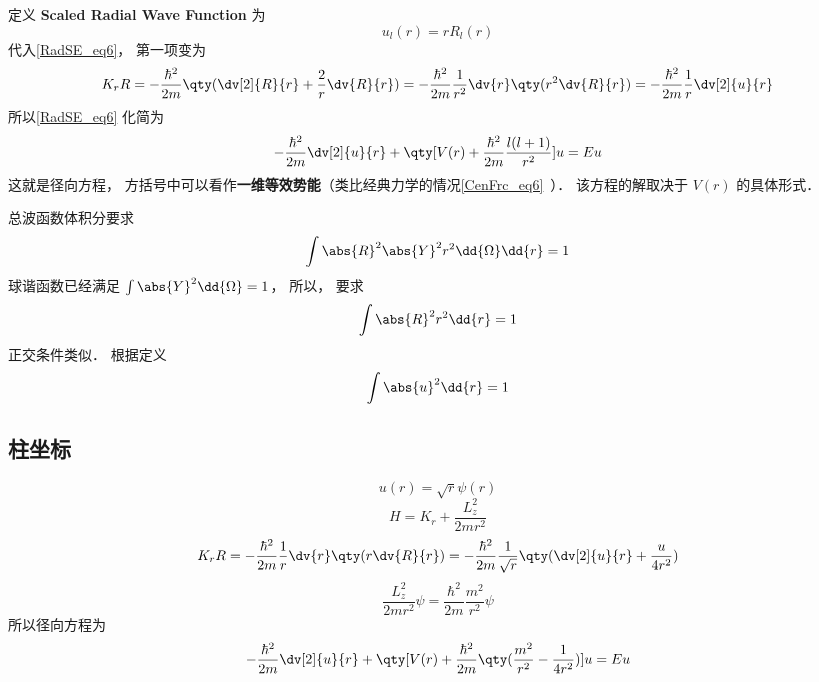 定义 \textbf{Scaled Radial Wave Function} 为
\begin{equation}
u_l(r) = r R_l(r)
\end{equation}
代入\autoref{RadSE_eq6}， 第一项变为
\begin{equation}
K_r R =  - \frac{\hbar^2}{2m} \qty(\dv[2]{R}{r} + \frac2r \dv{R}{r}) = -\frac{\hbar^2}{2m}\frac{1}{r^2} \dv{r} \qty(r^2\dv{R}{r}) =  - \frac{\hbar^2}{2m}\frac1r \dv[2]{u}{r}
\end{equation}
所以\autoref{RadSE_eq6} 化简为
\begin{equation}\label{RadSE_eq1}
-\frac{\hbar^2}{2m} \dv[2]{u}{r} + \qty[V(r) + \frac{\hbar^2}{2m}\frac{l(l + 1)}{r^2}]u = Eu
\end{equation}
这就是径向方程， 方括号中可以看作\textbf{一维等效势能}（类比经典力学的情况\autoref{CenFrc_eq6}~）． 该方程的解取决于 $V(r)$ 的具体形式．


总波函数体积分要求
\begin{equation}
\int \abs{R}^2 \abs{Y}^2 r^2 \dd{\Omega}\dd{r}  = 1
\end{equation}
球谐函数已经满足 $\int \abs{Y}^2 \dd{\Omega} = 1$，  所以， 要求
\begin{equation}
\int \abs{R}^2 r^2 \dd{r}  = 1
\end{equation}
正交条件类似． 根据定义
\begin{equation}
\int \abs{u}^2 \dd{r}  = 1
\end{equation}

\subsection{柱坐标}
\begin{equation}
u(r) = \sqrt r \psi (r)
\end{equation}
\begin{equation}
 H = K_r + \frac{L_z^2}{2m r^2}
\end{equation}
\begin{equation}
K_r R = -\frac{\hbar^2}{2m} \frac1r \dv{r} \qty(r \dv{R}{r}) =  - \frac{\hbar^2}{2m} \frac{1}{\sqrt r} \qty(\dv[2]{u}{r} + \frac{u}{4 r^2})
\end{equation}
\begin{equation}
\frac{L_z^2}{2m r^2}\psi  = \frac{\hbar^2}{2m} \frac{m^2}{r^2}\psi 
\end{equation}
所以径向方程为
\begin{equation}
- \frac{\hbar^2}{2m} \dv[2]{u}{r} + \qty[V(r) + \frac{\hbar^2}{2m} \qty(\frac{m^2}{r^2} - \frac{1}{4 r^2})]u = Eu
\end{equation}

